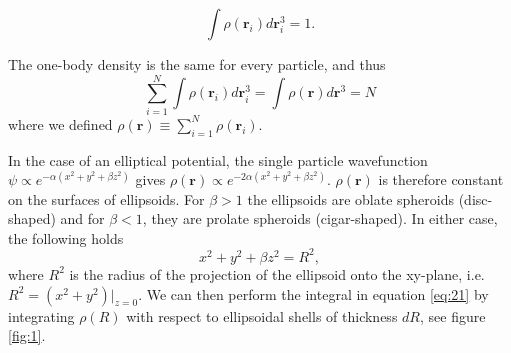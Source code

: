 \documentclass[
    a4paper, aps, twocolumn, floatfix, superscriptaddress,
    nofootinbib]{revtex4-1}
\begin{document}
\begin{equation}
    \int \rho(\boldsymbol{r}_i) d\boldsymbol{r}_i^3 = 1.
\end{equation}

The one-body density is the same for every particle, and thus 
\begin{equation}\label{eq:21}
    \sum_{i=1}^{N}\int \rho(\boldsymbol{r}_i) d\boldsymbol{r}_i^3 =
    \int \rho(\boldsymbol{r}) d\boldsymbol{r}^3 =N
\end{equation}
where we defined $\rho(\boldsymbol{r}) \equiv \sum_{i=1}^N \rho(\boldsymbol{r}_i)$. 

In the case of an elliptical potential, the single particle wavefunction $\psi \propto e^{-\alpha(x^2+y^2+\beta z^2)}$ gives 
$\rho(\boldsymbol{r}) \propto e^{-2\alpha(x^2+y^2+\beta z^2)}$. $\rho(\boldsymbol{r})$ is therefore constant on the surfaces of ellipsoids. For $\beta >1$ the ellipsoids are oblate spheroids (disc-shaped) and for $\beta<1$, they are prolate spheroids (cigar-shaped). In either case, the following holds 
\begin{equation}
    x^2+y^2+\beta z^2 = R^2,
\end{equation}
where $R^2$ is the radius of the projection of the ellipsoid onto the xy-plane, i.e. $R^2 = (x^2+y^2)|_{z=0}$. We can then perform the integral in equation \eqref{eq:21} by integrating $\rho(R)$ with respect to ellipsoidal shells of thickness $dR$, see figure \ref{fig:1}. 
\end{document}
